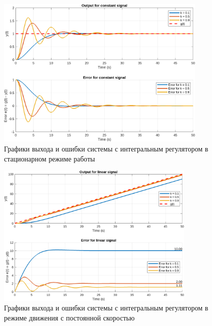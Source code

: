 \begin{figure}[H]
    \centering
    \includegraphics[width=0.9\textwidth]{figs/task_4_out_constant.png}
    \caption{Графики выхода и ошибки системы с интегральным регулятором в стационарном режиме работы}
    \label{fig:task_4_out_constant}
\end{figure}
\begin{figure}[H]
    \centering
    \includegraphics[width=0.85\textwidth]{figs/task_4_out_linear.png}
    \caption{Графики выхода и ошибки системы с интегральным регулятором в режиме движения с постоянной скоростью}
    \label{fig:task_4_out_linear}
\end{figure}
